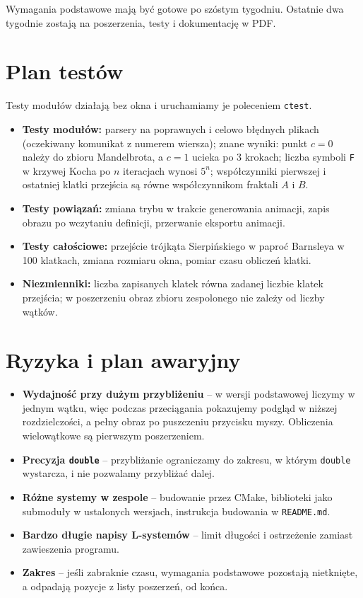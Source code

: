 \documentclass[11pt,a4paper]{article}
\newcommand{\kod}[1]{\texttt{#1}}
\begin{document}
Wymagania podstawowe mają być gotowe po szóstym tygodniu. Ostatnie dwa
tygodnie zostają na poszerzenia, testy i dokumentację w PDF.

\section{Plan testów}

Testy modułów działają bez okna i uruchamiamy je poleceniem \kod{ctest}.

\begin{itemize}
  \item \textbf{Testy modułów:} parsery na poprawnych i celowo błędnych
        plikach (oczekiwany komunikat z numerem wiersza); znane wyniki: punkt
        $c = 0$ należy do zbioru Mandelbrota, a $c = 1$ ucieka po 3 krokach;
        liczba symboli \kod{F} w krzywej Kocha po $n$ iteracjach wynosi $5^n$;
        współczynniki pierwszej i ostatniej klatki przejścia są równe
        współczynnikom fraktali $A$ i $B$.
  \item \textbf{Testy powiązań:} zmiana trybu w trakcie generowania animacji,
        zapis obrazu po wczytaniu definicji, przerwanie eksportu animacji.
  \item \textbf{Testy całościowe:} przejście trójkąta Sierpińskiego w paproć
        Barnsleya w 100 klatkach, zmiana rozmiaru okna, pomiar czasu obliczeń
        klatki.
  \item \textbf{Niezmienniki:} liczba zapisanych klatek równa zadanej liczbie
        klatek przejścia; w poszerzeniu obraz zbioru zespolonego nie zależy od
        liczby wątków.
\end{itemize}

\section{Ryzyka i plan awaryjny}

\begin{itemize}
  \item \textbf{Wydajność przy dużym przybliżeniu} -- w wersji podstawowej
        liczymy w jednym wątku, więc podczas przeciągania pokazujemy podgląd
        w niższej rozdzielczości, a pełny obraz po puszczeniu przycisku myszy.
        Obliczenia wielowątkowe są pierwszym poszerzeniem.
  \item \textbf{Precyzja \kod{double}} -- przybliżanie ograniczamy do zakresu,
        w którym \kod{double} wystarcza, i nie pozwalamy przybliżać dalej.
  \item \textbf{Różne systemy w zespole} -- budowanie przez CMake, biblioteki
        jako submoduły w ustalonych wersjach, instrukcja budowania w
        \kod{README.md}.
  \item \textbf{Bardzo długie napisy L-systemów} -- limit długości
        i ostrzeżenie zamiast zawieszenia programu.
  \item \textbf{Zakres} -- jeśli zabraknie czasu, wymagania podstawowe
        pozostają nietknięte, a odpadają pozycje z listy poszerzeń, od końca.
\end{itemize}
\end{document}
